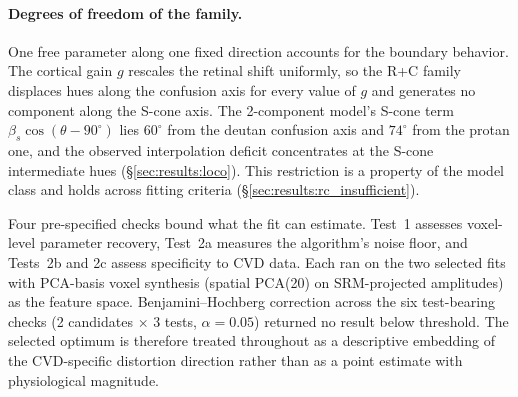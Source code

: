 \paragraph{Degrees of freedom of the family.}
One free parameter along one fixed direction accounts for the boundary behavior. The cortical gain $g$ rescales the retinal shift uniformly, so the R+C family displaces hues along the confusion axis for every value of $g$ and generates no component along the S-cone axis. The 2-component model's S-cone term $\beta_s \cos(\theta - 90^\circ)$ lies $60^\circ$ from the deutan confusion axis and $74^\circ$ from the protan one, and the observed interpolation deficit concentrates at the S-cone intermediate hues (\S\ref{sec:results:loco}). This restriction is a property of the model class and holds across fitting criteria (\S\ref{sec:results:rc_insufficient}).





Four pre-specified checks bound what the fit can estimate. Test~1 assesses voxel-level parameter recovery, Test~2a measures the algorithm's noise floor, and Tests~2b and 2c assess specificity to CVD data. Each ran on the two selected fits with PCA-basis voxel synthesis (spatial PCA(20) on SRM-projected amplitudes) as the feature space. Benjamini--Hochberg correction across the six test-bearing checks (2 candidates $\times$ 3 tests, $\alpha = 0.05$) returned no result below threshold. The selected optimum is therefore treated throughout as a descriptive embedding of the CVD-specific distortion direction rather than as a point estimate with physiological magnitude.

